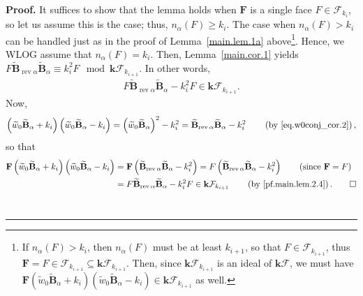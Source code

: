 \documentclass[12pt]{article}
\theoremstyle{definition}%
\theoremstyle{definition}%
\theoremstyle{remark}%
\newcommand{\tup}[1]{\left( #1 \right)}
\newcommand{\kk}{\mathbf{k}}
\newcommand{\kf}{\kk\mathcal{F}}
\newcommand{\BBt}{\widetilde{\mathbf{B}}}
\newcommand{\BBta}{\widetilde{\mathbf{B}}_{\alpha}}
\newcommand{\FF}{\mathbf{F}}
\newcommand{\CF}{\mathcal{F}}
\newcommand{\wotil}{\widetilde{w}_0}
\newcommand{\na}{n_{ \alpha } }%
\newcommand{\rev}{\operatorname{rev}}
\newenvironment{proof}[1][Proof]{\noindent\textbf{#1.} }{\ \rule{0.5em}{0.5em}}
\begin{document}
\begin{proof}
    It suffices to show that the lemma holds when $\FF$ is a single face $ F \in \CF_{k_i}$, so let us assume this is the case; thus, $ \na\tup{ F } \ge k_i $.
	The case when $ \na\tup{ F } > k_i $ can be handled just as in the proof of Lemma~\ref{main.lem.1a} above\footnote{%
	If $ \na\tup{ F } > k_i $, then $\na\tup{F}$ must be at least $ k_{i+1} $, so that $ F \in \CF_{k_{i+1}} $, thus $\FF = F \in \CF_{k_{i+1}} \subseteq \kf_{k_{i+1}}$. Then, since $ \kf_{k_{i+1}} $ is an ideal of $ \kf $, we must have $ \FF \tup{ \wotil\BBta + k_i }\tup{ \wotil\BBta - k_i } \in \kf_{k_{i+1}}$ as well.}.
    Hence, we WLOG assume that $ \na\tup{ F } = k_i $. Then,
	Lemma~\ref{main.cor.1} yields
	$F \BBt_{\rev \alpha} \BBta \equiv k_i^2 F \mod \kf_{k_{i+1}}$.
	In other words,
	\begin{align}
	F \BBt_{\rev \alpha} \BBta - k_i^2 F \in \kf_{k_{i+1}}.
	\label{pf.main.lem.2.4}
	\end{align}
	Now,
	\[
	\tup{ \wotil\BBta + k_i }\tup{ \wotil\BBta - k_i }
	= \tup{ \wotil\BBta }^2 - k_i^2
	= \BBt_{\rev \alpha} \BBta - k_i^2
	\qquad \tup{\text{by \eqref{eq.w0conj_cor.2}}},
	\]
	so that
    \begin{align*}
        \FF \tup{ \wotil\BBta + k_i }\tup{ \wotil\BBta - k_i }
		&= \FF \tup{\BBt_{\rev \alpha} \BBta - k_i^2}
		= F \tup{\BBt_{\rev \alpha} \BBta - k_i^2}
		\qquad \left(\text{since } \FF = F\right) \\
		&= F \BBt_{\rev \alpha} \BBta - k_i^2 F
		\in \kf_{k_{i+1}}
		\qquad \left(\text{by \eqref{pf.main.lem.2.4}}\right).
		\qedhere
    \end{align*}
\end{proof}
\end{document}
